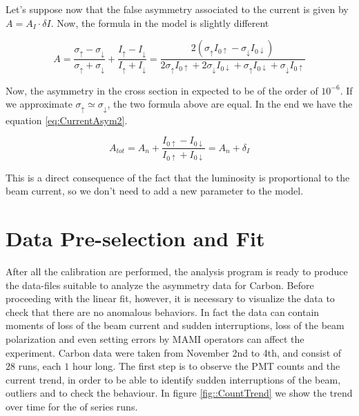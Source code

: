 Let's suppose now that the false asymmetry associated to the current is given by $A = A_{I} \cdot \delta I$.  
Now, the formula in the model is slightly different

\begin{equation}
A = \dfrac{\sigma_{\uparrow} - \sigma_{\downarrow}}{\sigma_{\uparrow} + \sigma_{\downarrow}} + \dfrac{I_{\uparrow} - I_{\downarrow}}{I_{\uparrow} + I_{\downarrow}} = \dfrac{2(\sigma_{\uparrow} I_{0 \uparrow} - \sigma_{\downarrow} I_{0 \downarrow})}{ 2\sigma_{\uparrow} I_{0 \uparrow} + 2\sigma_{\downarrow} I_{0 \downarrow} + \sigma_{\uparrow} I_{0 \downarrow} + \sigma_{\downarrow} I_{0 \uparrow}  }
\end{equation}

Now, the asymmetry in the cross section in expected to be of the order of $10^{-6}$. 
If we approximate $\sigma_{\uparrow} \simeq \sigma_{\downarrow}$, the two formula above are equal. In the end we have the equation \ref{eq:CurrentAsym2}.

\begin{equation} \label{eq:CurrentAsym2}
A_{tot} = A_{n} + \dfrac{I_{0 \uparrow} - I_{0 \downarrow}}{I_{0 \uparrow} + I_{0 \downarrow}} = A_{n} + \delta_{I}
\end{equation}

This is a direct consequence of the fact that the luminosity is proportional to the beam current, so we don't need to add a new parameter to the model.

\section{Data Pre-selection and Fit}

After all the calibration are performed, the analysis program is ready to produce the data-files suitable to analyze the asymmetry data for Carbon. Before proceeding with the linear fit, however, it is necessary to visualize the data to check that there are no anomalous behaviors. In fact the data can contain moments of loss of the beam current and sudden interruptions, loss of the beam polarization and even setting errors by MAMI operators can affect the experiment. Carbon data were taken from November 2nd to 4th, and consist of $28$ runs, each $1$ hour long.
The first step is to observe the PMT counts and the current trend, in order to be able to identify sudden interruptions of the beam, outliers and to check the behaviour. In figure \ref{fig::CountTrend} we show the trend over time for the of series runs.

